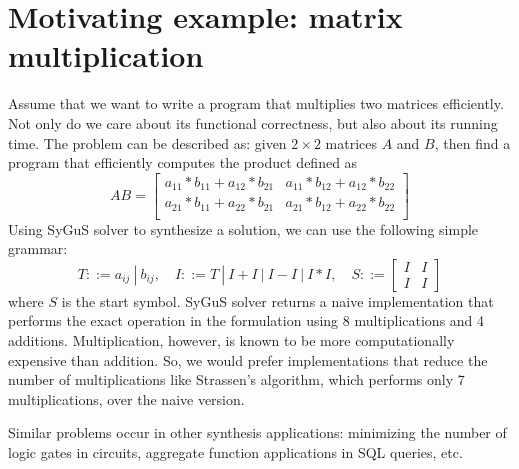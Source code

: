 \section{Motivating example: matrix multiplication}
\label{sec:example}

Assume that we want to write a program that multiplies two matrices efficiently. 
%
Not only do we care about its functional correctness, but also about its running time.
%
The problem can be described as: given $2 \times 2$ matrices $A$ and $B$, then find a program that efficiently computes the product defined as
%
\begin{equation}
    AB =
\begin{bmatrix}
a_{11} * b_{11} + a_{12} * b_{21} &
a_{11} * b_{12} + a_{12} * b_{22} \\
a_{21} * b_{11} + a_{22} * b_{21} &
a_{21} * b_{12} + a_{22} * b_{22} \\
\end{bmatrix}
\label{eqn:matrix-mul}
\end{equation}
%
%
Using SyGuS solver to synthesize a solution, we can use the following simple grammar:
%
\[
T ::= a_{ij} \ | \ b_{ij}, \quad
I ::= T \ | \ I + I \ | \ I - I \ | \ I * I, \quad
S ::=
\begin{bmatrix} I & I \\
I & I
\end{bmatrix}
\]
%
where $S$ is the start symbol. 
%
SyGuS solver returns a naive implementation that performs the exact operation in the formulation using 8 multiplications and 4 additions.
%
Multiplication, however, is known to be more computationally expensive than addition.
%
So, we would prefer implementations that reduce the number of multiplications like Strassen's algorithm, which performs only 7 multiplications, over the naive version.
%

Similar problems occur in other synthesis applications: minimizing the number of logic gates in circuits, aggregate function applications in SQL queries, etc.
